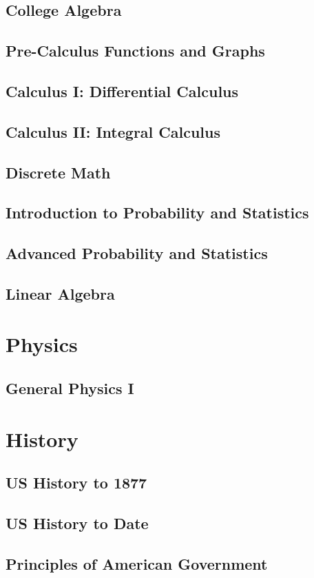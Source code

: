 \documentclass[11pt]{book}
\begin{document}
\chapter{College Algebra}
\chapter{Pre-Calculus Functions and Graphs}
\chapter{Calculus I: Differential Calculus}
\chapter{Calculus II: Integral Calculus}
\chapter{Discrete Math}
\chapter{Introduction to Probability and Statistics}
\chapter{Advanced Probability and Statistics}
\chapter{Linear Algebra}

\part{Physics}
\chapter{General Physics I}


\part{History}
\chapter{US History to 1877}
\chapter{US History to Date}
\chapter{Principles of American Government}
\end{document}
